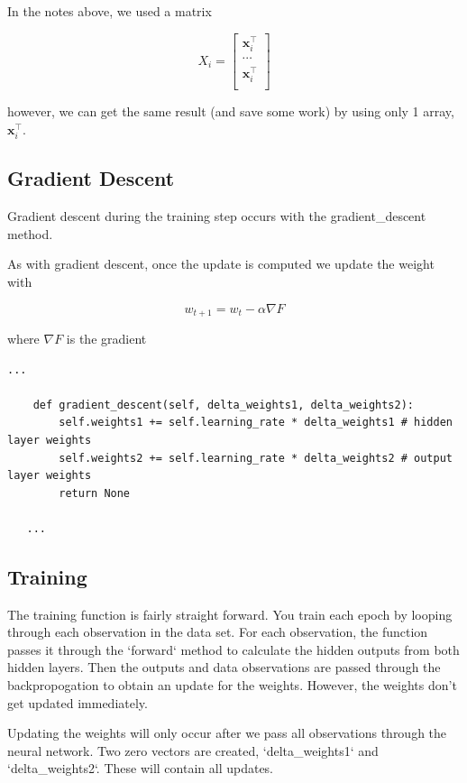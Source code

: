 \documentclass[12pt]{article}%
\begin{document}
In the notes above, we used a matrix 

	$$
	X_i = \begin{bmatrix}
	\mathbf{x}^\intercal_i \\
	\cdots \\
	\mathbf{x}^\intercal_i \\
	\end{bmatrix}
	$$

however, we can get the same result (and save some work) by using only 1 array, $\mathbf{x}^\intercal_i$.



\subsection{Gradient Descent}

	Gradient descent during the training step occurs with the gradient\_descent method.
	
	As with gradient descent, once the update is computed we update the weight with
	
	$$
	w_{t+1} = w_t - \alpha \nabla F
	$$	
	
where $\nabla F$ is the gradient
	
\begin{lstlisting}
...
	
    def gradient_descent(self, delta_weights1, delta_weights2):
        self.weights1 += self.learning_rate * delta_weights1 # hidden layer weights
        self.weights2 += self.learning_rate * delta_weights2 # output layer weights
        return None
   
   ...         
\end{lstlisting}



\subsection{Training}

The training function is fairly straight forward. You train each epoch by looping through each observation in the data set. For each observation, the function passes it through the `forward` method to calculate the hidden outputs from both hidden layers. Then the outputs and data observations are passed through the backpropogation to obtain an update for the weights. However, the weights don't get updated immediately. 

Updating the weights will only occur after we pass all observations through the neural network. Two zero vectors are created, `delta\_weights1` and `delta\_weights2`. These will contain all updates.
\end{document}
